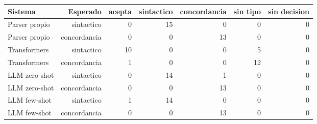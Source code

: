 \begin{tabular}{lrrrrrr}
\toprule
Sistema & Esperado & acepta & sintactico & concordancia & sin tipo & sin decision \\
\midrule
Parser propio & sintactico & 0 & 15 & 0 & 0 & 0 \\
Parser propio & concordancia & 0 & 0 & 13 & 0 & 0 \\
Transformers & sintactico & 10 & 0 & 0 & 5 & 0 \\
Transformers & concordancia & 1 & 0 & 0 & 12 & 0 \\
LLM zero-shot & sintactico & 0 & 14 & 1 & 0 & 0 \\
LLM zero-shot & concordancia & 0 & 0 & 13 & 0 & 0 \\
LLM few-shot & sintactico & 1 & 14 & 0 & 0 & 0 \\
LLM few-shot & concordancia & 0 & 0 & 13 & 0 & 0 \\
\bottomrule
\end{tabular}
